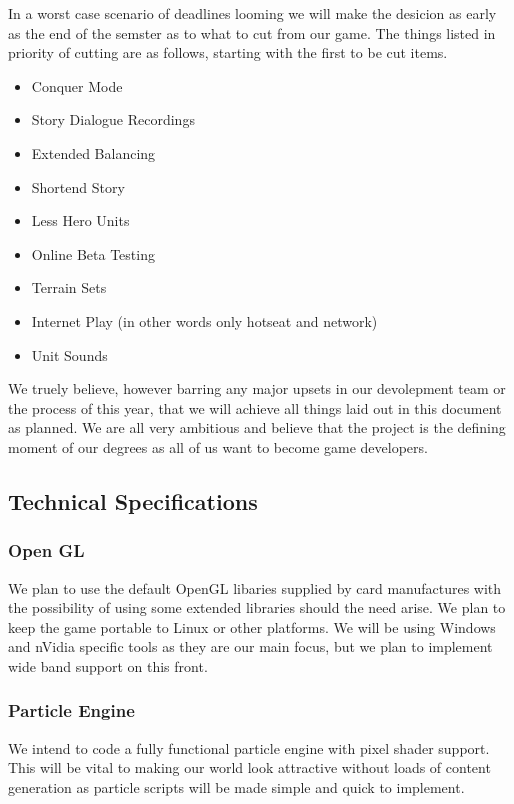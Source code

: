 \documentclass[a4paper,twocolumn]{article}
\begin{document}
In a worst case scenario of deadlines looming we will make the desicion as early as the end of the semster as to what to cut from our game. The things listed in priority of cutting are as follows, starting with the first to be cut items.

\begin{itemize}
\item Conquer Mode
\item Story Dialogue Recordings
\item Extended Balancing
\item Shortend Story
\item Less Hero Units
\item Online Beta Testing
\item Terrain Sets
\item Internet Play (in other words only hotseat and network)
\item Unit Sounds
\end{itemize}

We truely believe, however barring any major upsets in our devolepment team or the process of this year, that we will achieve all things laid out in this document as planned. We are all very ambitious and believe that the project is the defining moment of our degrees as all of us want to become game developers.

\subsection{Technical Specifications}

\subsubsection{Open GL}

We plan to use the default OpenGL libaries supplied by card manufactures with the possibility of using some extended libraries should the need  arise. We plan to keep the game portable to Linux or other platforms. We will be using Windows and nVidia specific tools as they are our main focus, but we plan to implement wide band support on this front.

\subsubsection{Particle Engine}

We intend to code a fully functional particle engine with pixel shader support. This will be vital to making our world look attractive without loads of content generation as particle scripts will be made simple and quick to implement.
\end{document}
